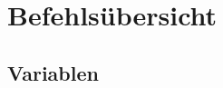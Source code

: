 \documentclass[c_worksheet.tex]{subfiles}
\begin{document}
	
\chapter{Befehlsübersicht} 

\section{Variablen}

 
\end{document}
